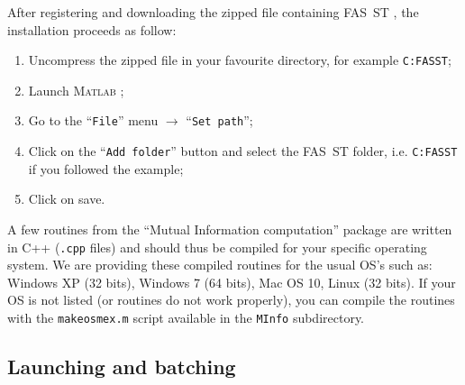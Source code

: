 \documentclass[a4paper,titlepage]{article}
\def\dblS{\hbox{S\hskip -4.5pt S}}
\newcommand{\bslash}{\texttt{\symbol{92}}}
\newcommand{\matlab}{\textsc{Matlab }}
\newcommand{\fasst}{FA\dblS T } 	%
\begin{document}
After registering and downloading the zipped file containing \fasst\hspace{-4pt}, the installation proceeds as follow:
\begin{enumerate}\addtolength{\itemsep}{-1\baselineskip}
\item	Uncompress the zipped file in your favourite directory, for example {\tt C:\bslash FASST\bslash };\\
\item	Launch \matlab ;\\
\item	Go to the ``{\tt File}'' menu $\rightarrow$ ``{\tt Set path}'';\\
\item	Click on the ``{\tt Add folder}'' button and select the \fasst folder, i.e. {\tt C:\bslash FASST\bslash } if you followed the example;\\
\item	Click on save.
\end{enumerate}

A few routines from the ``Mutual Information computation'' package\cite{Peng2005} are written in C++ ({\tt .cpp} files) and should thus be compiled for your specific operating system. We are providing these compiled routines for the usual OS's such as: Windows XP (32 bits), Windows 7 (64 bits), Mac OS 10, Linux (32 bits). If your OS is not listed (or routines do not work properly), you can compile the routines with the {\tt makeosmex.m} script available in the {\tt MInfo} subdirectory.

\subsection{Launching and batching}
\end{document}
